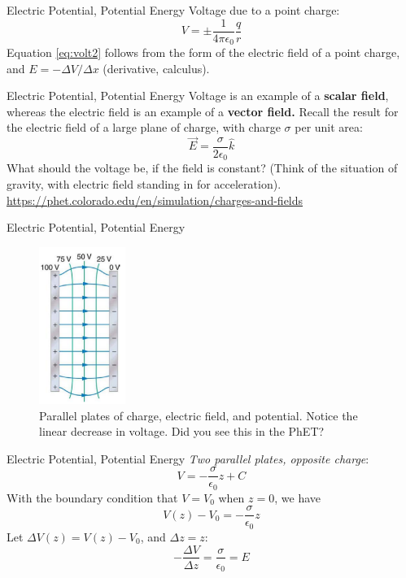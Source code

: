 \documentclass{beamer}
\begin{document}
\begin{frame}{Electric Potential, Potential Energy}
Voltage due to a point charge:
\begin{equation}
\boxed{
V = \pm \frac{1}{4\pi \epsilon_0} \frac{q}{r}} \label{eq:volt2}
\end{equation}
Equation \ref{eq:volt2} follows from the form of the electric field of a point charge, and $E = -\Delta V/\Delta x$ (derivative, calculus).
\end{frame}

\begin{frame}{Electric Potential, Potential Energy}
Voltage is an example of a \textbf{scalar field}, whereas the electric field is an example of a \textbf{vector field.}  Recall the result for the electric field of a large plane of charge, with charge $\sigma$ per unit area:
\begin{equation}
\vec{E} = \frac{\sigma}{2\epsilon_0} \hat{k}
\end{equation}
What should the voltage be, if the field is constant?  (Think of the situation of gravity, with electric field standing in for acceleration). \\ \vspace{0.5cm}
\url{https://phet.colorado.edu/en/simulation/charges-and-fields}
\end{frame}

\begin{frame}{Electric Potential, Potential Energy}
\begin{figure}
\centering
\includegraphics[width=0.25\textwidth]{figures/plates.png}
\caption{\label{fig:plates} Parallel plates of charge, electric field, and potential.  Notice the linear decrease in voltage.  Did you see this in the PhET?}
\end{figure}
\end{frame}

\begin{frame}{Electric Potential, Potential Energy}
\textit{Two parallel plates, opposite charge}:
\begin{equation}
V = -\frac{\sigma}{\epsilon_0}z + C
\end{equation}
With the boundary condition that $V = V_0$ when $z = 0$, we have
\begin{equation}
V(z) - V_0 = -\frac{\sigma}{\epsilon_0}z
\end{equation}
Let $\Delta V(z) = V(z) - V_0$, and $\Delta z = z$:
\begin{equation}
-\frac{\Delta V}{\Delta z} = \frac{\sigma}{\epsilon_0} =  E
\end{equation}
\end{frame}
\end{document}
